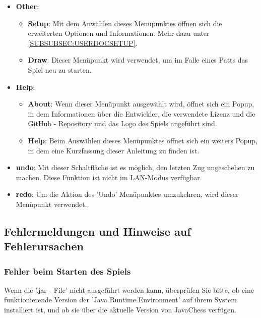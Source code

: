 \documentclass[12pt,a4paper]{article}
\begin{document}
\begin{itemize}
	\item{\textbf{Other}: \begin{itemize}
	
			\item{\textbf{Setup}: Mit dem Anwählen dieses Menüpunktes öffnen sich die erweiterten Optionen und Informationen. Mehr dazu unter \ref{SUBSUBSEC:USERDOCSETUP}. }
			
			\item{\textbf{Draw}: Dieser Menüpunkt wird verwendet, um im Falle eines Patts das Spiel neu zu starten.}
			
	\end{itemize}}
	
	\item{\textbf{Help}: \begin{itemize}

		\item{\textbf{About}: Wenn dieser Menüpunkt ausgewählt wird, öffnet sich ein Popup, in dem Informationen über die Entwickler, die verwendete Lizenz und die GitHub - Repository und das Logo des Spiels angeführt sind. }	
		
		\item{\textbf{Help}: Beim Auswählen dieses Menüpunktes öffnet sich ein weiters Popup, in dem eine Kurzfassung dieser Anleitung zu finden ist. }	
	
	\end{itemize}}
	
	\item{\textbf{undo}: Mit dieser Schaltfläche ist es möglich, den letzten Zug ungeschehen zu machen. Diese Funktion ist nicht im LAN-Modus verfügbar.}
	
	\item{\textbf{redo}: Um die Aktion des 'Undo' Menüpunktes umzukehren, wird dieser Menüpunkt verwendet. }
		
\end{itemize}
 
 \subsection{Fehlermeldungen und Hinweise auf Fehlerursachen}
 
 \subsubsection{Fehler beim Starten des Spiels}
 
  Wenn die '.jar - File' nicht ausgeführt werden kann, überprüfen Sie bitte, ob eine funktionierende Version der 'Java Runtime Environment' auf ihrem System installiert ist, und ob sie über die aktuelle Version von JavaChess verfügen. 
 
\end{document}
